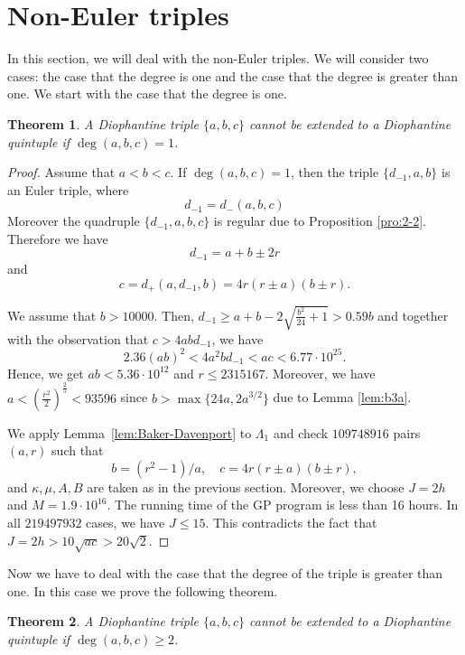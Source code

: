 \documentclass{amsart}
\newtheorem{theorem}{Theorem}
\theoremstyle{definition}
\begin{document}
\section{Non-Euler triples} \label{sec:8}
In this section, we will deal with the non-Euler triples. We will consider two cases: 
the case that the degree is one and the case that the degree is greater than one.
We start with the case that the degree is one.

\begin{theorem}\label{thm:eulerplus}
A Diophantine triple $\{a,b,c\}$ cannot be extended to a Diophantine quintuple if $\deg(a,b,c)=1$.  
\end{theorem}

\begin{proof}
Assume that $a<b<c$. If $\deg(a,b,c)=1$, then the triple $\{d_{-1},a, b\}$ is an Euler triple, where
$$
d_{-1} = d_{-}(a,b,c)
$$
 Moreover the quadruple $\{d_{-1},a,b,c\}$ is regular due to Proposition \ref{pro:2-2}. Therefore we have 
$$
d_{-1} = a+b \pm 2r
$$
and 
$$
c= d_{+}(a,d_{-1},b) = 4r(r\pm a)(b\pm r). 
$$

We assume that $b>10000$. Then, $d_{-1} \ge a+b - 2\sqrt{\frac{b^2}{24}+1} > 0.59b$ and together with the observation that $c>4abd_{-1}$, we have 
$$
2.36 (ab)^2<4a^2bd_{-1}<ac < 6.77 \cdot 10^{25}. 
$$ 
Hence, we get $ab<5.36\cdot 10^{12}$ and $r\le 2315167$. Moreover, we have 
$a<\left(\frac{r^2}{2}\right)^{\frac{2}{5}} <93596$ since $b>\max\{24a,2a^{3/2}\}$ due to Lemma \ref{lem:b3a}. 

We apply Lemma~\ref{lem:Baker-Davenport} to $\Lambda_1$ and check $109748916$ pairs $(a,r)$ such that
 $$
b=(r^2-1)/{a},\quad c= 4r(r\pm a)(b\pm r), 
$$
and $\kappa, \mu, A, B$ are taken as in the previous section. Moreover, we choose $J=2h$ and $M=1.9\cdot 10^{16}$.
The running time of the GP program is less than 16 hours. In all $219497932$ cases, we have $J\le 15$. This contradicts the fact that $J=2h>10\sqrt{ac}>20\sqrt{2}$.

\end{proof}

Now we have to deal with the case that the degree of the triple is greater than one. In this case we prove the following theorem.

\begin{theorem}\label{thm:deg2}
A Diophantine triple $\{a,b,c\}$ cannot be extended to a Diophantine quintuple if $\deg(a,b,c)\ge2$.  
\end{theorem}
\end{document}
